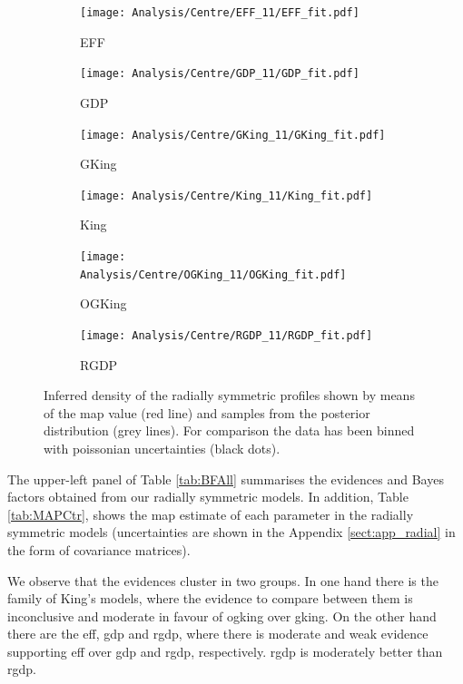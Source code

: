\begin {figure}
\centering
\begin{subfigure}[t]{0.45\textwidth}
 \texttt{[image: Analysis/Centre/EFF\_11/EFF\_fit.pdf]}
 \caption{EFF}  
    \end{subfigure}
    \begin{subfigure}[t]{0.45\textwidth}
 \texttt{[image: Analysis/Centre/GDP\_11/GDP\_fit.pdf]}
 \caption{GDP}  
    \end{subfigure}
    \begin{subfigure}[t]{0.45\textwidth}
 \texttt{[image: Analysis/Centre/GKing\_11/GKing\_fit.pdf]}
 \caption{GKing}  
    \end{subfigure}
    \begin{subfigure}[t]{0.45\textwidth}
 \texttt{[image: Analysis/Centre/King\_11/King\_fit.pdf]}
 \caption{King}  
    \end{subfigure}
    \begin{subfigure}[t]{0.45\textwidth}
 \texttt{[image: Analysis/Centre/OGKing\_11/OGKing\_fit.pdf]}
 \caption{OGKing}  
    \end{subfigure}
        \begin{subfigure}[t]{0.45\textwidth}
 \texttt{[image: Analysis/Centre/RGDP\_11/RGDP\_fit.pdf]}
 \caption{RGDP}  
    \end{subfigure}
  \caption{Inferred density of the radially symmetric profiles shown by means of the \gls{map} value (red line) and samples from the posterior distribution (grey lines). 
  For comparison the data has been binned with poissonian uncertainties (black dots).}
\label{fig:PSDctr}
\end {figure}

The upper-left panel of Table \ref{tab:BFAll} summarises the evidences and Bayes
factors obtained from our radially symmetric models. In addition, Table \ref{tab:MAPCtr}, shows the \gls{map}
 estimate of each parameter in the radially symmetric models
(uncertainties are shown in the Appendix \ref{sect:app_radial} in the form of covariance matrices).
 
   
 \begin{table}[ht!]
  \centering
      \caption[]{Maximum-a-posteriori estimates of the inferred parameters in each radially symmetric model.}
         \label{tab:MAPCtr}
         \resizebox{\textwidth}{!}{
         
         }
   \end{table}
 
We observe that the evidences cluster in two groups. In one hand there is the family of King's
models, where the evidence to compare between them is inconclusive and moderate in favour of \gls{ogking} over \gls{gking}. 
On the other hand there are the \gls{eff}, \gls{gdp} and \gls{rgdp}, where there is moderate and weak evidence
supporting \gls{eff} over \gls{gdp} and \gls{rgdp}, respectively. \gls{rgdp} is moderately better than \gls{rgdp}.


